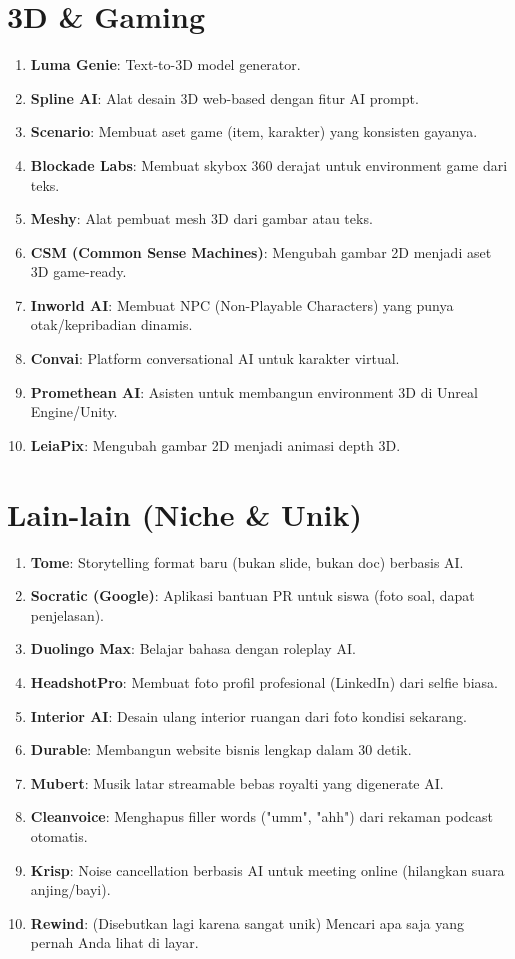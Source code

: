 \section{3D \& Gaming}
\begin{enumerate}
    \item \textbf{Luma Genie}: Text-to-3D model generator.
    \item \textbf{Spline AI}: Alat desain 3D web-based dengan fitur AI prompt.
    \item \textbf{Scenario}: Membuat aset game (item, karakter) yang konsisten gayanya.
    \item \textbf{Blockade Labs}: Membuat skybox 360 derajat untuk environment game dari teks.
    \item \textbf{Meshy}: Alat pembuat mesh 3D dari gambar atau teks.
    \item \textbf{CSM (Common Sense Machines)}: Mengubah gambar 2D menjadi aset 3D game-ready.
    \item \textbf{Inworld AI}: Membuat NPC (Non-Playable Characters) yang punya otak/kepribadian dinamis.
    \item \textbf{Convai}: Platform conversational AI untuk karakter virtual.
    \item \textbf{Promethean AI}: Asisten untuk membangun environment 3D di Unreal Engine/Unity.
    \item \textbf{LeiaPix}: Mengubah gambar 2D menjadi animasi depth 3D.
\end{enumerate}

\section{Lain-lain (Niche \& Unik)}
\begin{enumerate}
    \item \textbf{Tome}: Storytelling format baru (bukan slide, bukan doc) berbasis AI.
    \item \textbf{Socratic (Google)}: Aplikasi bantuan PR untuk siswa (foto soal, dapat penjelasan).
    \item \textbf{Duolingo Max}: Belajar bahasa dengan roleplay AI.
    \item \textbf{HeadshotPro}: Membuat foto profil profesional (LinkedIn) dari selfie biasa.
    \item \textbf{Interior AI}: Desain ulang interior ruangan dari foto kondisi sekarang.
    \item \textbf{Durable}: Membangun website bisnis lengkap dalam 30 detik.
    \item \textbf{Mubert}: Musik latar streamable bebas royalti yang digenerate AI.
    \item \textbf{Cleanvoice}: Menghapus filler words ("umm", "ahh") dari rekaman podcast otomatis.
    \item \textbf{Krisp}: Noise cancellation berbasis AI untuk meeting online (hilangkan suara anjing/bayi).
    \item \textbf{Rewind}: (Disebutkan lagi karena sangat unik) Mencari apa saja yang pernah Anda lihat di layar.
\end{enumerate}

